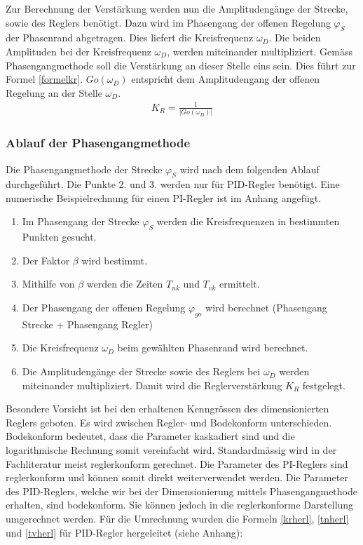 Zur Berechnung der Verstärkung werden nun die Amplitudengänge der Strecke, sowie des Reglers benötigt. Dazu wird im Phasengang der offenen Regelung $\varphi_S$ der Phasenrand abgetragen. Dies liefert die Kreisfrequenz $\omega_D$. Die beiden Amplituden bei der Kreisfrequenz $\omega_D$, werden miteinander multipliziert. Gemäss Phasengangmethode soll die Verstärkung an dieser Stelle eins sein. Dies führt zur Formel \ref{formelkr}. $Go(\omega_D)$ entspricht dem Amplitudengang der offenen Regelung an der Stelle $\omega_D$. \newline
{}
\begin{align}
K_R=\frac{1}{\vert{Go(\omega_D)}\vert{}}
\label{formelkr}
\end{align}

\newpage
\subsubsection{Ablauf der Phasengangmethode}
Die Phasengangmethode der Strecke $\varphi_S$ wird nach dem folgenden Ablauf durchgeführt. Die Punkte 2. und 3. werden nur für PID-Regler benötigt. Eine numerische Beispielrechnung für einen PI-Regler ist im Anhang angefügt.
\begin{enumerate}
\item Im Phasengang der Strecke $\varphi_S$ werden die Kreisfrequenzen in bestimmten Punkten gesucht.
\item Der Faktor $\beta$ wird bestimmt.
\item Mithilfe von $\beta$ werden die Zeiten $T_{nk}$ und $T_{vk}$ ermittelt.
\item Der Phasengang der offenen Regelung $\varphi_{go}$ wird berechnet (Phasengang Strecke + Phasengang Regler)
\item Die Kreisfrequenz $\omega_D$ beim gewählten Phasenrand wird berechnet.
\item Die Amplitudengänge der Strecke sowie des Reglers bei $\omega_D$ werden miteinander multipliziert. Damit wird die Reglerverstärkung $K_R$ festgelegt. 
\end{enumerate}

Besondere Vorsicht ist bei den erhaltenen Kenngrössen des dimensionierten Reglers geboten. Es wird zwischen Regler- und Bodekonform unterschieden. Bodekonform bedeutet, dass die Parameter kaskadiert sind und die logarithmische Rechnung somit vereinfacht wird. Standardmässig wird in der Fachliteratur meist reglerkonform gerechnet. Die Parameter des PI-Reglers sind reglerkonform und können somit direkt weiterverwendet werden. Die Parameter des PID-Reglers, welche wir bei der Dimensionierung mittels Phasengangmethode erhalten, sind bodekonform. Sie können jedoch in die reglerkonforme Darstellung umgerechnet werden. Für die Umrechnung wurden die Formeln \ref{krherl}, \ref{tnherl} und \ref{tvherl} für PID-Regler hergeleitet (siehe Anhang): \cite{zellwegerpha}\newline
{}

